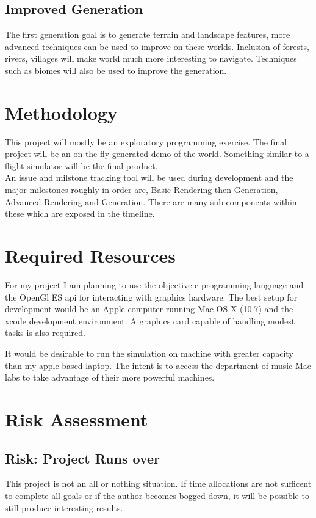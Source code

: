 \documentclass[a4paper,12pt,notitlepage]{article}
\begin{document}
\subsection*{Improved Generation}
The first generation goal is to generate terrain and landscape features, more 
advanced techniques can be used to improve on these worlds. Inclusion of forests,
rivers, villages will make world much more interesting to navigate. Techniques 
such as biomes will also be used to improve the generation.

\section{Methodology}
This project will mostly be an exploratory programming exercise. The final 
project will be an on the fly generated demo of the world. Something similar to
a flight simulator will be the final product.\\

An issue and milstone tracking tool will be used during development and the major
milestones roughly in order are, Basic Rendering then Generation, Advanced 
Rendering and Generation. There are many sub components within these which are
exposed in the timeline.

\section{Required Resources}
For my project I am planning to use the objective c programming language and the
OpenGl ES api for interacting with graphics hardware. The best setup for 
development would be an Apple computer running Mac OS X (10.7) and the xcode 
development environment. A graphics card capable of handling modest tasks is also
required. 

It would be desirable to run the simulation on machine with greater capacity than
my apple based laptop. The intent is to access the department of music Mac labs
to take advantage of their more powerful machines.

\section{Risk Assessment}
\subsection*{Risk: Project Runs over}
This project is not an all or nothing situation. If time allocations are not
sufficent to complete all goals or if the author becomes bogged down, it will
be possible to still produce interesting results.\\
\end{document}
